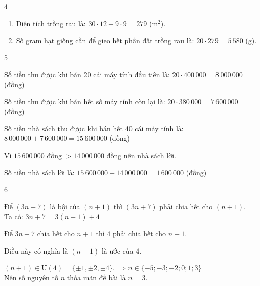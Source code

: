 \begin{Solbook}{4}
 \par \noindent  \begin {enumerate} \item Diện tích trồng rau là: $30\cdot 12 - 9\cdot 9 = 279$ (m$^2$). \item Số gram hạt giống cần để gieo hết phần đất trồng rau là: $20\cdot 279 = 5\,580$ (g). \end {enumerate}  \hfill \qedEX 
\end{Solbook}
\begin{Solbook}{5}
 \par \noindent  Số tiền thu được khi bán 20 cái máy tính đầu tiên là: $20 \cdot 400\,000 = 8\,000\,000$ (đồng) \par Số tiền thu được khi bán hết số máy tính còn lại là: $20 \cdot 380\,000 = 7\,600\,000$ (đồng) \par Số tiền nhà sách thu được khi bán hết 40 cái máy tính là: $8\,000\,000 + 7\,600\,000 = 15\,600\,000$ (đồng) \par Vì $15\,600\,000$ đồng $> 14\,000\,000$ đồng nên nhà sách lời. \par Số tiền nhà sách lời là: $15\,600\,000 - 14\,000\,000 = 1\,600\,000$ (đồng)  \hfill \qedEX 
\end{Solbook}
\begin{Solbook}{6}
 \par \noindent Để $(3n+7)$ là bội của $(n+1)$ thì $(3n+7)$ phải chia hết cho $(n+1)$.\\ Ta có: $3n+7 = 3(n+1) + 4$ \par Để $3n+7$ chia hết cho $n+1$ thì $4$ phải chia hết cho $n+1$. \par Điều này có nghĩa là $(n+1)$ là ước của $4$. \par $(n+1)\in $Ư$(4)=\{\pm 1, \pm 2, \pm 4\}$. $ \Rightarrow n\in \{-5;-3;-2;0;1;3\}$\\ Nên số nguyên tố $n$ thỏa mãn đề bài là $n = 3$. \hfill \qedEX 
\end{Solbook}
